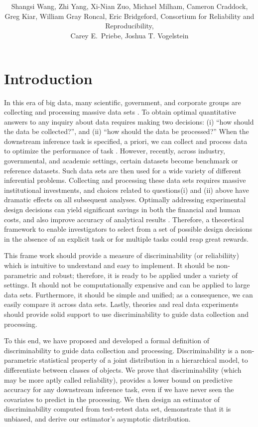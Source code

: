 \documentclass{article}
\title{\vspace{-50pt}
\db{Optimal Decisions for Discovery Science via Maximizing Discriminability: \\ Applications in Neuroimaging}
}
\author{Shangsi Wang, Zhi Yang, Xi-Nian Zuo, Michael Milham, Cameron Craddock,  \\ 
Greg Kiar, William Gray Roncal, Eric Bridgeford,
Consortium for Reliability and Reproducibility, \\ Carey E.~Priebe, Joshua T. Vogelstein}
\begin{document}
\maketitle
\tableofcontents
\newpage
\linenumbers

\section{Introduction}

In this era of big data, many scientific, government, and corporate groups are collecting and processing massive data sets \cite{manyika2011big,wu2014data}. To obtain optimal quantitative answers to any inquiry about data requires making two decisions: (i) “how should the data be collected?”, and (ii) “how should the data be processed?”  When the downstream inference task is specified, a priori, we can collect and process data to optimize the performance of task \cite{kohavi1995study,reiter2011mprophet}. However, recently, across industry, governmental, and academic settings, certain datasets become benchmark or reference datasets. Such data sets are then used for a wide variety of different inferential problems. Collecting and processing these data sets requires massive institutional investments, and choices related to questions(i) and (ii) above have dramatic effects on all subsequent analyses. Optimally addressing experimental design decisions can yield significant savings in both the financial and human costs, and also improve accuracy of analytical results \cite{ballou1985modeling,dale1999optimal,banga2008parameter}. Therefore, a theoretical framework to enable investigators to select from a set of possible design decisions in the absence of an explicit task or for multiple tasks could reap great rewards.

This frame work should provide a measure of discriminability (or reliabiliity) which is intuitive to understand and easy to implement. It should be non-parametric and robust; therefore, it is ready to be applied under a variety of settings. It should not be computationally expensive and can be applied to large data sets. Furthermore, it should be simple and unified; as a consequence, we can easily compare it across data sets. Lastly, theories and real data experiments should provide solid support to use discriminability to guide data collection and processing. 
 
To this end, we have proposed and developed a formal definition of discriminability to guide data collection and processing. Discriminability is a non-parametric statistical property of a joint distribution in a hierarchical model, to differentiate between classes of objects. We prove that discriminability (which may be more aptly called reliability), provides a lower bound on predictive accuracy for any downstream inference task, even if we have never seen the covariates to predict in the processing. We then design an estimator of discriminability computed from test-retest data set, demonstrate that it is unbiased, and derive our estimator’s asymptotic distribution. 
\end{document}
